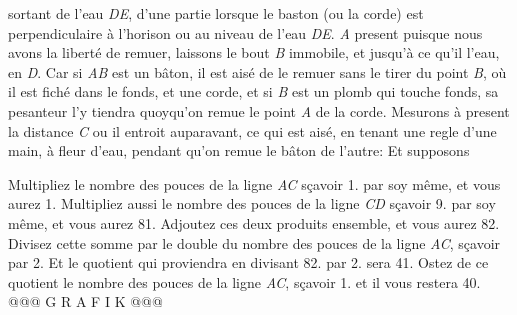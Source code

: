                      sortant de  l'eau \textit{DE}, d'une partie \textit{} lorsque le baston  (ou la corde) est perpendiculaire \`{a} l'horison ou au niveau de l'eau \textit{DE}. \textit{A} present puisque nous avons la libert\'{e} de remuer, laissons le bout \textit{B}  immobile, et  jusqu'\`{a} ce qu'il  l'eau, en \textit{D}. Car si \textit{AB} est un bâton, il est ais\'{e} de le remuer  sans le tirer du point \textit{B}, o\`{u} il est fich\'{e} dans le fonds, et  une corde, et si \textit{B} est un plomb qui touche fonds, sa pesanteur  l'y tiendra quoyqu'on remue le point \textit{A} de la corde. Mesurons  \`{a} present la distance  \textit{C} ou il entroit auparavant, ce qui  est ais\'{e}, en tenant une regle d'une main, \`{a} fleur d'eau, pendant qu'on  remue le bâton de l'autre: Et supposons \textit{} \pend \pstart  \begin{center}\end{center} \pend \pstart  Multipliez le nombre des pouces de la ligne \textit{AC} s\c{c}avoir 1. par soy même,  et vous aurez 1. Multipliez aussi le nombre des pouces de la ligne \textit{CD}  s\c{c}avoir 9. par soy même, et vous aurez 81. Adjoutez ces deux  produits ensemble, et vous aurez 82. Divisez cette somme par  le double du nombre des pouces de la ligne \textit{AC}, s\c{c}avoir par 2.  Et le quotient qui proviendra en divisant 82. par 2. sera 41. Ostez  de ce quotient le nombre des pouces de la ligne \textit{AC}, s\c{c}avoir 1. et il vous  restera 40. @@@ G R A F I K @@@%
